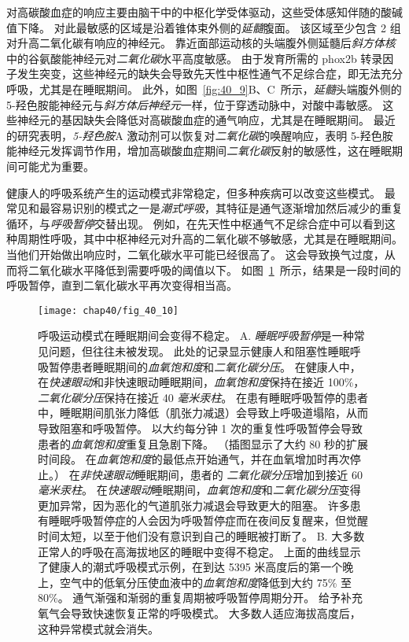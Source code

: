 对高碳酸血症的响应主要由脑干中的中枢化学受体驱动，这些受体感知伴随的酸碱值下降。
对此最敏感的区域是沿着锥体束外侧的\textit{延髓}腹面。
该区域至少包含 2 组对升高二氧化碳有响应的神经元。
靠近面部运动核的头端腹外侧延髓后\textit{斜方体核}中的谷氨酸能神经元对\textit{二氧化碳}水平高度敏感。
由于发育所需的 phox2b 转录因子发生突变，这些神经元的缺失会导致先天性中枢性通气不足综合症，即无法充分呼吸，尤其是在睡眠期间。
此外，如图~\ref{fig:40_9}B、C~所示，\textit{延髓}头端腹外侧的 5-羟色胺能神经元与\textit{斜方体后神经元}一样，位于穿透动脉中，对酸中毒敏感。
这些神经元的基因缺失会降低对高碳酸血症的通气响应，尤其是在睡眠期间。
最近的研究表明，\textit{5-羟色胺}A 激动剂可以恢复对\textit{二氧化碳}的唤醒响应，表明 5-羟色胺能神经元发挥调节作用，增加高碳酸血症期间\textit{二氧化碳}反射的敏感性，这在睡眠期间可能尤为重要。


健康人的呼吸系统产生的运动模式非常稳定，但多种疾病可以改变这些模式。
最常见和最容易识别的模式之一是\textit{潮式呼吸}，其特征是通气逐渐增加然后减少的重复循环，与\textit{呼吸暂停}交替出现。
例如，在先天性中枢通气不足综合症中可以看到这种周期性呼吸，其中中枢神经元对升高的二氧化碳不够敏感，尤其是在睡眠期间。
当他们开始做出响应时，二氧化碳水平可能已经很高了。
这会导致换气过度，从而将二氧化碳水平降低到需要呼吸的阈值以下。
如图~\ref{fig:40_10}~所示，结果是一段时间的呼吸暂停，直到二氧化碳水平再次变得相当高。


\begin{figure}[htbp]
	\centering
	\texttt{[image: chap40/fig\_40\_10]}
	\caption{呼吸运动模式在睡眠期间会变得不稳定。
		A. \textit{睡眠呼吸暂停}是一种常见问题，但往往未被发现。
		此处的记录显示健康人和阻塞性睡眠呼吸暂停患者睡眠期间的\textit{血氧饱和度}和\textit{二氧化碳分压}。
		在健康人中，在\textit{快速眼动}和非快速眼动睡眠期间，\textit{血氧饱和度}保持在接近 100\%，\textit{二氧化碳分压}保持在接近 40 \textit{毫米汞柱}。
		在患有睡眠呼吸暂停的患者中，睡眠期间肌张力降低（肌张力减退）会导致上呼吸道塌陷，从而导致阻塞和呼吸暂停。
		以大约每分钟 1 次的重复性呼吸暂停会导致患者的\textit{血氧饱和度}重复且急剧下降。
		（插图显示了大约 80 秒的扩展时间段。
		在\textit{血氧饱和度}的最低点开始通气，并在血氧增加时再次停止。）
		在\textit{非快速眼动}睡眠期间，患者的 \textit{二氧化碳分压}增加到接近 60 \textit{毫米汞柱}。 
		在\textit{快速眼动}睡眠期间，\textit{血氧饱和度}和\textit{二氧化碳分压}变得更加异常，因为恶化的气道肌张力减退会导致更大的阻塞。
		许多患有睡眠呼吸暂停症的人会因为呼吸暂停症而在夜间反复醒来，但觉醒时间太短，以至于他们没有意识到自己的睡眠被打断了\cite{grunstein1990neural}。 
		B. 大多数正常人的呼吸在高海拔地区的睡眠中变得不稳定。
		上面的曲线显示了健康人的潮式呼吸模式示例，在到达 5395 米高度后的第一个晚上，空气中的低氧分压使血液中的\textit{血氧饱和度}降低到大约 75\% 至 80\%。
		通气渐强和渐弱的重复周期被呼吸暂停周期分开。
		给予补充氧气会导致快速恢复正常的呼吸模式。
		大多数人适应海拔高度后，这种异常模式就会消失\cite{lahiri1984sleep}。}
	\label{fig:40_10}
\end{figure}


